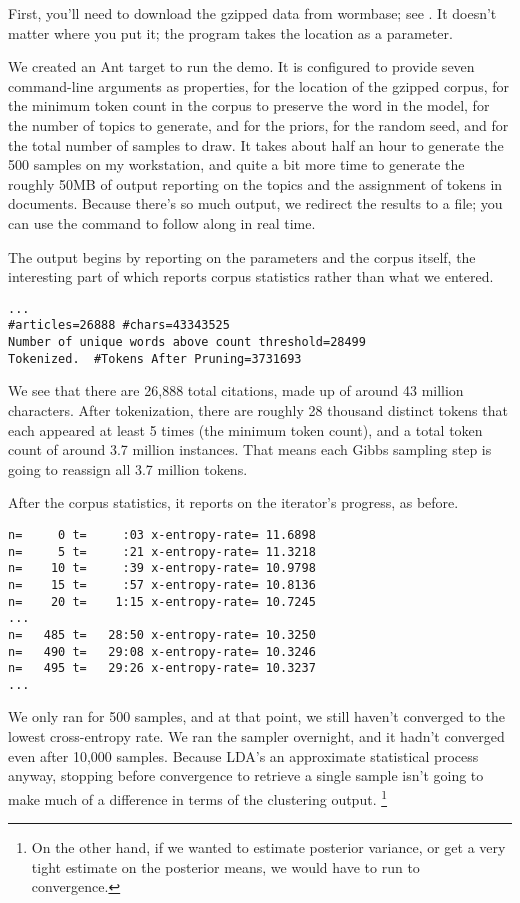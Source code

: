 First, you'll need to download the gzipped data from wormbase; see
.  It
doesn't matter where you put it; the program takes the location as
a parameter.

We created an Ant target  to run the demo.  It is
configured to provide seven command-line arguments as properties,
 for the location of the gzipped corpus,
 for the minimum token count in the corpus to
preserve the word in the model,  for the number of
topics to generate,  and  for the
priors,  for the random seed, and 
for the total number of samples to draw.
%
%
It takes about half an hour to generate the 500 samples on my
workstation, and quite a bit more time to generate the roughly 50MB of
output reporting on the topics and the assignment of tokens in
documents.  Because there's so much output, we redirect the results to
a file; you can use the command  to follow along in real
time.

The output begins by reporting on the parameters and the corpus itself,
the interesting part of which reports corpus statistics rather than
what we entered.
%
\begin{verbatim}
...
#articles=26888 #chars=43343525
Number of unique words above count threshold=28499
Tokenized.  #Tokens After Pruning=3731693
\end{verbatim}
%
We see that there are 26,888 total citations, made up of around 43
million characters.  After tokenization, there are roughly 28 thousand
distinct tokens that each appeared at least 5 times (the minimum token
count), and a total token count of around 3.7 million instances.  That
means each Gibbs sampling step is going to reassign all 3.7 million
tokens.

After the corpus statistics, it reports on the iterator's progress, as
before.
%
\begin{verbatim}
n=     0 t=     :03 x-entropy-rate= 11.6898
n=     5 t=     :21 x-entropy-rate= 11.3218
n=    10 t=     :39 x-entropy-rate= 10.9798
n=    15 t=     :57 x-entropy-rate= 10.8136
n=    20 t=    1:15 x-entropy-rate= 10.7245
...
n=   485 t=   28:50 x-entropy-rate= 10.3250
n=   490 t=   29:08 x-entropy-rate= 10.3246
n=   495 t=   29:26 x-entropy-rate= 10.3237
...
\end{verbatim}
%
We only ran for 500 samples, and at that point, we still haven't
converged to the lowest cross-entropy rate.  We ran the sampler
overnight, and it hadn't converged even after 10,000 samples.  Because
LDA's an approximate statistical process anyway, stopping before
convergence to retrieve a single sample isn't going to make much
of a difference in terms of the clustering output.%
%
\footnote{On the other hand, if we wanted to estimate posterior variance, or
  get a very tight estimate on the posterior means, we would have to
  run to convergence.}

